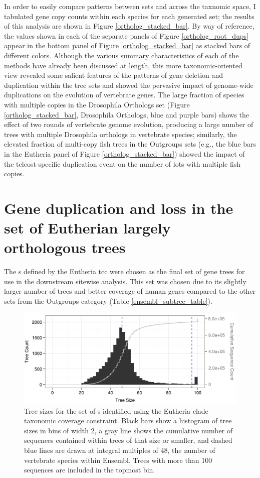 In order to easily compare patterns between \subtr sets and across the
taxnomic space, I tabulated gene copy counts within each \ens species
for each generated \subtr set; the results of this analysis are shown
in Figure \ref{ortholog_stacked_bar}. By way of reference, the values
shown in each of the separate panels of Figure
\ref{ortholog_root_dups} appear in the bottom panel of Figure
\ref{ortholog_stacked_bar} as stacked bars of different
colors. Although the various summary characteristics of each of the
\subtr methods have already been discussed at length, this more
taxonomic-oriented view revealed some salient features of the patterns
of gene deletion and duplication within the tree sets and showed the
pervasive impact of genome-wide duplications on the evolution of
vertebrate genes. The large fraction of species with multiple copies
in the Drosophila Orthologs \subtr set (Figure
\ref{ortholog_stacked_bar}, Drosophila Orthologs, blue and purple
bars) shows the effect of two rounds of vertebrate genome evolution,
producing a large number of trees with multiple Drosophila orthologs
in vertebrate species; similarly, the elevated fraction of multi-copy
fish trees in the Outgroups \subtr sets (e.g., the blue bars in the
Eutheria panel of Figure \ref{ortholog_stacked_bar}) showed the impact
of the teleost-specific duplication event on the number of \mammln{}
\acp{lot} with multiple fish copies.

\section{Gene duplication and loss in the set of Eutherian largely orthologous trees}

The \subtr{}s defined by the Eutheria \ac{tcc} were chosen as the
final set of gene trees for use in the downstream sitewise
analysis. This set was chosen due to its slightly larger number of
trees and better coverage of human genes compared to the other \subtr
sets from the Outgroups category (Table \ref{ensembl_subtree_table}).

\begin{figure}
\centering
\includegraphics[scale=0.9]{Figs/hist_euth_roots.pdf}
\caption{Tree sizes for the set of \subtr{}s identified using the
  Eutheria clade taxonomic coverage constraint. Black bars show a
  histogram of tree sizes in bins of width 2, a gray line shows
  the cumulative number of sequences contained within trees of that
  size or smaller, and dashed blue lines are drawn at integral
  multiples of 48, the number of vertebrate species within
  Ensembl. Trees with more than 100 sequences are included in the
  topmost bin.}
\label{fig_ensembl_euth_hist}
\end{figure}

